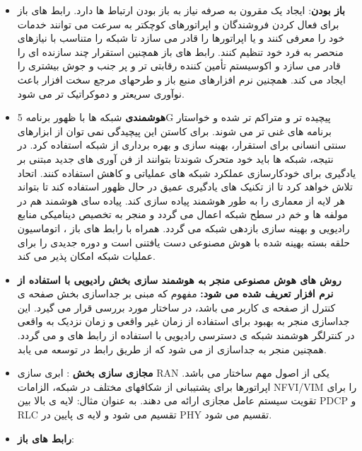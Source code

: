 \begin{itemize}
\item \textbf{باز بودن}:
ایجاد یک  مقرون به صرفه نیاز به باز بودن ارتباط ها دارد.
رابط های باز برای فعال کردن فروشندگان و اپراتورهای کوچکتر به سرعت می توانند خدمات خود را معرفی کنند و یا اپراتورها را قادر می سازد تا شبکه را متناسب با نیازهای منحصر به فرد خود تنظیم کنند.
رابط های باز همچنین استقرار چند سازنده ای را قادر می سازد و اکوسیستم تأمین کننده رقابتی تر و پر جنب و جوش بیشتری را ایجاد می کند.
 همچنین نرم افزارهای منبع باز و طرحهای مرجع سخت افزار باعث نوآوری سریعتر و دموکراتیک تر می شود.
 \item \textbf{هوشمندی}
 شبکه ها با ظهور برنامه 5G پیچیده تر و متراکم تر شده و خواستار برنامه های غنی تر می شوند.
 برای کاستن این پیچیدگی نمی توان از ابزارهای سنتی انسانی  برای استقرار، بهینه سازی و بهره برداری از شبکه استفاده کرد.
 در نتیجه، شبکه ها باید خود متحرک شوندتا بتوانند از فن آوری های جدید مبتنی بر یادگیری برای خودکارسازی عملکرد شبکه های عملیاتی و کاهش  استفاده کنند.
 اتحاد  تلاش خواهد کرد تا از تکنیک های یادگیری عمیق در حال ظهور استفاده کند تا بتواند هر لایه از معماری   را به طور هوشمند پیاده سازی کند.
 پیاده سای هوشمند هم در مولفه ها و خم در سطح شبکه اعمال می گردد و منجر به تخصیص دینامیکی منابع رادیویی و بهینه سازی بازدهی شبکه می گردد.
 همراه با رابط های باز ، اتوماسیون حلقه بسته بهینه شده با هوش مصنوعی دست یافتنی است و دوره جدیدی را برای عملیات شبکه امکان پذیر می کند.
\item \textbf{روش های هوش مصنوعی 
  منجر به هوشمند سازی بخش رادیویی با استفاده از نرم افزار تعریف شده  
  می شود:}
   مفهوم 
  که مبنی بر جداسازی 
   بخش صفحه ی کنترل  از
   صفحه ی کاربر 
می باشد، در ساختار 
مورد بررسی قرار می گیرد.
این جداسازی منجر به بهبود 
برای استفاده از زمان غیر واقعی و زمان نزدیک به واقعی در کنترلگر هوشمند شبکه ی دسترسی رادیویی   
با استفاده از رابط های 
و
 می گردد.
همچنین 
منجر به جداسازی 
 از 
 می شود
 که از طریق رابط  در  توسعه می یابد.
\item \textbf{مجازی سازی بخش }:
 ابری سازی RAN یکی از اصول مهم ساختار 
  می باشد.
 اپراتورها برای پشتیبانی از شکافهای مختلف در شبکه، الزامات NFVI/VIM را برای تقویت سیستم عامل مجازی ارائه می دهند.
 به عنوان مثال: لایه ی بالا بین PDCP و RLC تقسیم می شود و لایه ی پایین در PHY تقسیم می شود.
\item \textbf{رابط های باز}:

\end{itemize}

